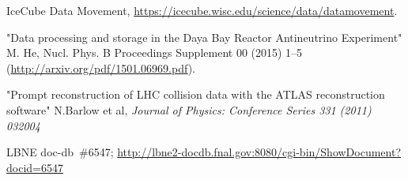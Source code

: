 \begin{thebibliography}{99}
%
%

 IceCube Data Movement, \url{https://icecube.wisc.edu/science/data/datamovement}.

"Data processing and storage in the Daya Bay Reactor Antineutrino Experiment" M. He, Nucl. Phys. B Proceedings Supplement 00 (2015) 1–5 (\url{http://arxiv.org/pdf/1501.06969.pdf}).

 "Prompt reconstruction of LHC collision data with the ATLAS reconstruction software" N.Barlow et al, \textit{Journal of Physics: Conference Series 331 (2011) 032004}

%
%
 
%
%
 LBNE doc-db~\#6547; \url{http://lbne2-docdb.fnal.gov:8080/cgi-bin/ShowDocument?docid=6547}

%
%


\end{thebibliography}
